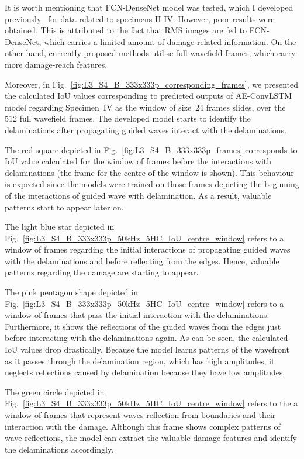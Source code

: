 It is worth mentioning that FCN-DenseNet model was tested, which I developed previously~\cite{Ijjeh2021} for data related to specimens II-IV. 
However, poor results were obtained. 
This is attributed to the fact that RMS images are fed to FCN-DenseNet, which carries a limited amount of damage-related information. 
On the other hand, currently proposed methods utilise full wavefield frames, which carry more damage-reach features. 

Moreover, in Fig.~\ref{fig:L3_S4_B_333x333p_corresponding_frames}, we presented the calculated IoU values corresponding to predicted outputs of AE-ConvLSTM model regarding Specimen~IV as the window of size~\(24\) frames slides, over the \(512\) full wavefield frames.
The developed model starts to identify the delaminations after propagating guided waves interact with the delaminations.

The red square depicted in Fig.~\ref{fig:L3_S4_B_333x333p_frames} corresponds to IoU value calculated for the window of frames before the interactions with delaminations (the frame for the centre of the window is shown).
This behaviour is expected since the models were trained on those frames depicting the beginning of the interactions of guided wave with delamination. 
As a result, valuable patterns start to appear later on.

The light blue star depicted in Fig.~\ref{fig:L3_S4_B_333x333p_50kHz_5HC_IoU_centre_window} refers to a window of frames regarding the initial interactions of propagating guided waves with the delaminations and before reflecting from the edges.
Hence, valuable patterns regarding the damage are starting to appear.

The pink pentagon shape depicted in Fig.~\ref{fig:L3_S4_B_333x333p_50kHz_5HC_IoU_centre_window} refers to a window of frames that pass the initial interaction with the delaminations. 
Furthermore, it shows the reflections of the guided waves from the edges just before interacting with the delaminations again.
As can be seen, the calculated IoU values drop drastically.
Because the model learns patterns of the wavefront as it passes through the delamination region, which has high amplitudes, it neglects reflections caused by delamination because they have low amplitudes.

The green circle depicted in Fig.~\ref{fig:L3_S4_B_333x333p_50kHz_5HC_IoU_centre_window} refers to the a window of frames that represent waves reflection from boundaries and their interaction with the damage.
Although this frame shows complex patterns of wave reflections, the model can extract the valuable damage features and identify the delaminations accordingly.

